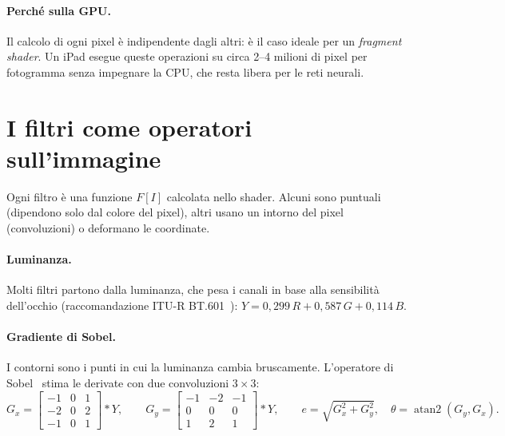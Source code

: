 \documentclass[11pt,a4paper]{article}
\begin{document}
\paragraph{Perché sulla GPU.} Il calcolo di ogni pixel è indipendente dagli altri: è il caso
ideale per un \emph{fragment shader}. Un iPad esegue queste operazioni su circa 2--4 milioni di
pixel per fotogramma senza impegnare la CPU, che resta libera per le reti neurali.

\section{I filtri come operatori sull'immagine}

Ogni filtro è una funzione $F[I]$ calcolata nello shader. Alcuni sono puntuali (dipendono solo dal
colore del pixel), altri usano un intorno del pixel (convoluzioni) o deformano le coordinate.

\paragraph{Luminanza.} Molti filtri partono dalla luminanza, che pesa i canali in base alla
sensibilità dell'occhio (raccomandazione ITU-R BT.601~\cite{bt601}):
$Y=0{,}299\,R+0{,}587\,G+0{,}114\,B$.

\paragraph{Gradiente di Sobel.} I contorni sono i punti in cui la luminanza cambia
bruscamente. L'operatore di Sobel~\cite{sobel1968,gonzalez2018} stima le derivate con due
convoluzioni $3\times3$:
\begin{equation}
  G_x=\begin{bmatrix}-1&0&1\\-2&0&2\\-1&0&1\end{bmatrix}*Y,\qquad
  G_y=\begin{bmatrix}-1&-2&-1\\0&0&0\\1&2&1\end{bmatrix}*Y,\qquad
  e=\sqrt{G_x^2+G_y^2},\quad \theta=\operatorname{atan2}(G_y,G_x).
\end{equation}
\end{document}
